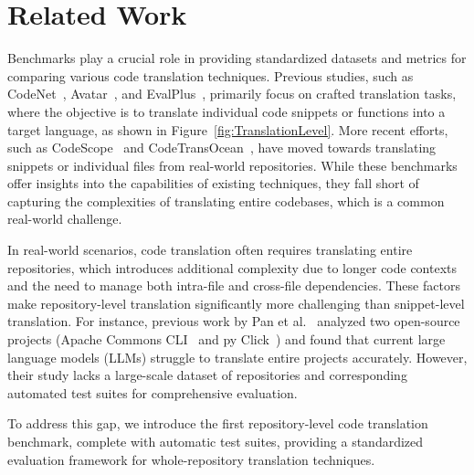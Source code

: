 


\section{Related Work}
Benchmarks play a crucial role in providing standardized datasets and metrics for comparing various code translation techniques. Previous studies, such as CodeNet~\cite{puri2021codenet}, Avatar~\cite{ahmad2021avatar}, and EvalPlus~\cite{liu2024your}, primarily focus on crafted translation tasks, where the objective is to translate individual code snippets or functions into a target language, as shown in Figure~\ref{fig:TranslationLevel}. More recent efforts, such as CodeScope~\cite{yan2023codescope} and CodeTransOcean~\cite{yan2023codetransocean}, have moved towards translating snippets or individual files from real-world repositories. While these benchmarks offer insights into the capabilities of existing techniques, they fall short of capturing the complexities of translating entire codebases, which is a common real-world challenge.

In real-world scenarios, code translation often requires translating entire repositories, which introduces additional complexity due to longer code contexts and the need to manage both intra-file and cross-file dependencies. These factors make repository-level translation significantly more challenging than snippet-level translation. For instance, previous work by Pan et al.~\cite{pan2024lost} analyzed two open-source projects (Apache Commons CLI~\cite{apachecommonscli} and py Click~\cite{click}) and found that current large language models (LLMs) struggle to translate entire projects accurately. However, their study lacks a large-scale dataset of repositories and corresponding automated test suites for comprehensive evaluation.

To address this gap, we introduce the first repository-level code translation benchmark, complete with automatic test suites, providing a standardized evaluation framework for whole-repository translation techniques.

